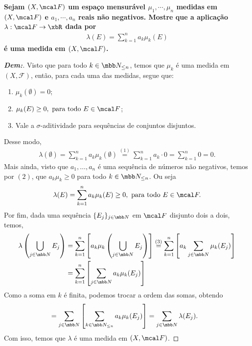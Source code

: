 \newpage
{}
\bigline
\textbf{Sejam $(X, \mcal F)$ um espaço mensurável $\mu_1, \cdots, \mu_n$ medidas em 
$(X, \mcal F)$ e $a_1, \cdots, a_n$ reais não negativos. Mostre que a aplicação 
$\lambda: \mcal F \rightarrow \xbR$ dada por 
\begin{align*}
  \lambda(E) = \sum_{k=1}^{n} a_k\mu_k(E)
\end{align*}
é uma medida em $(X, \mcal F)$.}
\begin{proof}[\textbf{Dem:}]
Visto que para todo $k \in \mbb N_{\le n}$, temos que $\mu_k$ é uma medida em $(X, \mathcal F)$,
então, para cada uma das medidas, segue que:
\begin{enumerate}
  \item $\mu_k(\emptyset) = 0$; 
  \item $\mu_k(E) \ge 0, \text{ para todo } E \in \mcal F$; 
  \item Vale a $\sigma$-aditividade para sequências de conjuntos disjuntos.
\end{enumerate}
Desse modo,
\begin{align*}
  \lambda(\emptyset) = \sum_{k=1}^{n} a_k\mu_k(\emptyset) \stackrel{(1)}{=} 
  \sum_{k=1}^{n} a_k \cdot0 = \sum_{k=1}^n 0 = 0. 
\end{align*}
Mais ainda, visto que $a_1, \dots, a_n$ é uma sequência de números não negativos,
  temos por $(2)$, que $a_k \mu_k \ge 0$ para todo $k \in \mbb N_{\le n}$. Ou seja 
\begin{align*}
  \lambda(E) = \sum_{k=1}^n a_k \mu_k(E) \ge 0, \text{ para todo } E \in \mcal F.
\end{align*}
  Por fim, dada uma sequência $\{E_j\}_{j \in \mbb N}$ em $\mcal F$ disjunto dois a dois,
  temos, 
  \begin{align*}
    \lambda\left(\bigcup\limits_{j\in \mbb N} E_j \right) &= 
    \sum_{k=1}^{n} \left[a_k \mu_k\left(\bigcup\limits_{j\in \mbb N} E_j\right)\right]
    \stackrel{(3)}{=}\sum_{k=1}^{n} \left[a_k \sum_{j \in \mbb N}\mu_k(E_j)\right]\\ 
    &= \sum_{k=1}^{n} \left[\sum_{j \in \mbb N}a_k\mu_k(E_j)\right]
    \end{align*}
Como a soma em $k$ é finita, podemos trocar a ordem das somas, obtendo
\begin{align*}
    &= \sum_{j \in \mbb N} \left[\sum_{k \in \mbb N_{\le n}}a_k\mu_k(E_j)\right]
    = \sum_{j \in \mbb N} \lambda(E_j).
  \end{align*}
  Com isso, temos que $\lambda$ é uma medida em $(X, \mcal F)$.
\end{proof}

